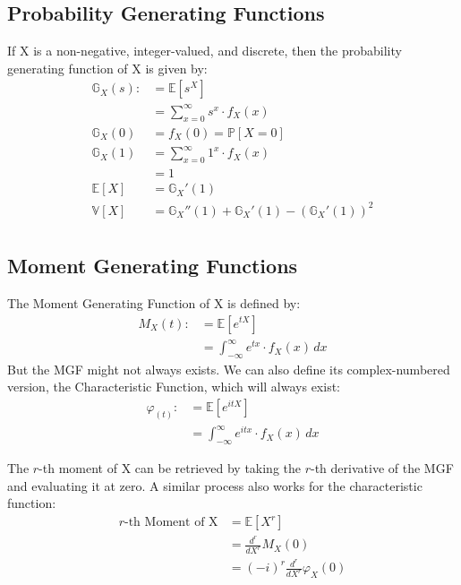 \subsection{Probability Generating Functions}
If X is a non-negative, integer-valued, and discrete, then the probability
generating function of X is given by:
\begin{equation*}
    \begin{aligned}
        \mathbb{G}_X(s) :&= \mathbb{E}[s^X] \\
                         &= \sum_{x = 0}^\infty s^x \cdot f_X(x) \\
        \mathbb{G}_X(0)  &= f_X(0) = \mathbb{P}[X=0] \\
        \mathbb{G}_X(1)  &= \sum_{x = 0}^\infty 1^x \cdot f_X(x) \\
                         &= 1 \\
        \mathbb{E}[X] &= \mathbb{G}_X'(1)  \\
        \mathbb{V}[X] &= \mathbb{G}_X''(1) + \mathbb{G}_X'(1) - \left(\mathbb{G}_X'(1)\right)^2 \\
    \end{aligned}
\end{equation*}

\subsection{Moment Generating Functions}
The Moment Generating Function of X is defined by:
\begin{equation*}
    \begin{aligned}
        M_X(t) :&= \mathbb{E}[e^{tX}] \\
                &= \int_{-\infty}^{\infty} e^{tx} \cdot f_X(x) \,dx 
    \end{aligned}
\end{equation*}
But the MGF might not always exists. We can also define its complex-numbered
version, the Characteristic Function, which will always exist:
\begin{equation*}
    \begin{aligned}
        \varphi_(t) :&= \mathbb{E}[e^{itX}] \\
                &= \int_{-\infty}^{\infty} e^{itx} \cdot f_X(x) \,dx 
    \end{aligned}
\end{equation*}

The $r$-th moment of X can be retrieved by taking the $r$-th derivative of the
MGF and evaluating it at zero. A similar process also works for the
characteristic function:
\begin{equation*}
    \begin{aligned}
        \text{$r$-th Moment of X} &= \mathbb{E}[X^r] \\
                                  &= \frac{d^r}{dX^r} M_X(0) \\
                                  &= (-i)^r \frac{d^r}{dX^r} \varphi_X(0) \\
    \end{aligned}
\end{equation*}



